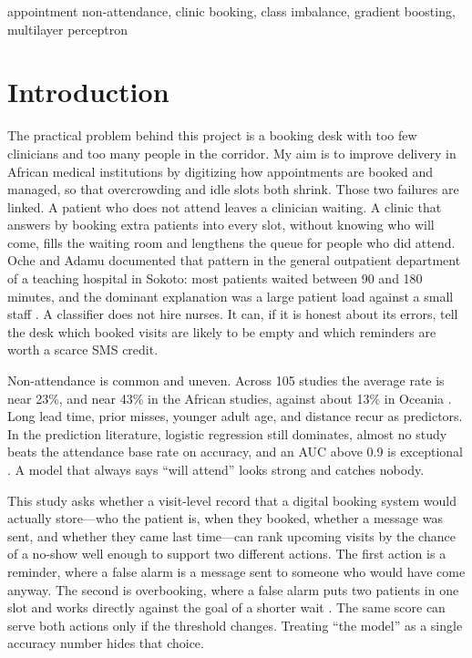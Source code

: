 \documentclass[journal]{IEEEtran}
\begin{document}
\begin{IEEEkeywords}
appointment non-attendance, clinic booking, class imbalance, gradient boosting, multilayer perceptron
\end{IEEEkeywords}

\section{Introduction}
The practical problem behind this project is a booking desk with too few clinicians and too many people in the corridor. My aim is to improve delivery in African medical institutions by digitizing how appointments are booked and managed, so that overcrowding and idle slots both shrink. Those two failures are linked. A patient who does not attend leaves a clinician waiting. A clinic that answers by booking extra patients into every slot, without knowing who will come, fills the waiting room and lengthens the queue for people who did attend. Oche and Adamu documented that pattern in the general outpatient department of a teaching hospital in Sokoto: most patients waited between 90 and 180 minutes, and the dominant explanation was a large patient load against a small staff \cite{oche2013}. A classifier does not hire nurses. It can, if it is honest about its errors, tell the desk which booked visits are likely to be empty and which reminders are worth a scarce SMS credit.

Non-attendance is common and uneven. Across 105 studies the average rate is near 23\%, and near 43\% in the African studies, against about 13\% in Oceania \cite{dantas2018}. Long lead time, prior misses, younger adult age, and distance recur as predictors. In the prediction literature, logistic regression still dominates, almost no study beats the attendance base rate on accuracy, and an AUC above 0.9 is exceptional \cite{carreras2020}. A model that always says ``will attend'' looks strong and catches nobody.

This study asks whether a visit-level record that a digital booking system would actually store---who the patient is, when they booked, whether a message was sent, and whether they came last time---can rank upcoming visits by the chance of a no-show well enough to support two different actions. The first action is a reminder, where a false alarm is a message sent to someone who would have come anyway. The second is overbooking, where a false alarm puts two patients in one slot and works directly against the goal of a shorter wait \cite{huang2014}. The same score can serve both actions only if the threshold changes. Treating ``the model'' as a single accuracy number hides that choice.
\end{document}
